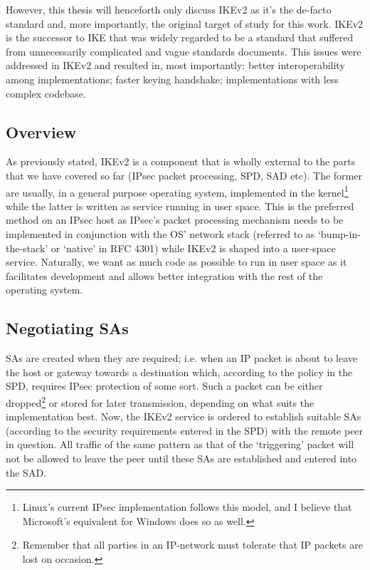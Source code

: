 \documentclass[final,a4paper,twoside,11pt,onecolumn]{report}
\begin{document}
However, this thesis will henceforth only discuss IKEv2 as it's the de-facto standard and, more importantly, the original target of study for this work. IKEv2 is the successor to IKE that was widely regarded to be a standard that suffered from unnecessarily complicated and vague standards documents. This issues were addressed in IKEv2 and resulted in, most importantly: better interoperability among implementations; faster keying handshake; implementations with less complex codebase.

\subsection{Overview}
As previously stated, IKEv2 is a component that is wholly external to the parts that we have covered so far (IPsec packet processing, SPD, SAD etc). The former are usually, in a general purpose operating system, implemented in the kernel\footnote{Linux's current IPsec implementation follows this model, and I believe that Microsoft's equivalent for Windows does so as well.} while the latter is written as service running in user space. This is the preferred method on an IPsec host as IPsec's packet processing mechanism needs to be implemented in conjunction with the OS' network stack (referred to as `bump-in-the-stack' or `native' in RFC 4301\citep[p.10-11]{rfc4301}) while IKEv2 is shaped into a user-space service. Naturally, we want as much code as possible to run in user space as it facilitates development and allows better integration with the rest of the operating system.

\subsection{Negotiating SAs}
SAs are created when they are required; i.e. when an IP packet is about to leave the host or gateway towards a destination which, according to the policy in the SPD, requires IPsec protection of some sort. Such a packet can be either dropped\footnote{Remember that all parties in an IP-network must tolerate that IP packets are lost on occasion.} or stored for later transmission, depending on what suits the implementation best. Now, the IKEv2 service is ordered to establish suitable SAs (according to the security requirements entered in the SPD) with the remote peer in question. All traffic of the same pattern as that of the `triggering' packet will not be allowed to leave the peer until these SAs are established and entered into the SAD.
\end{document}
